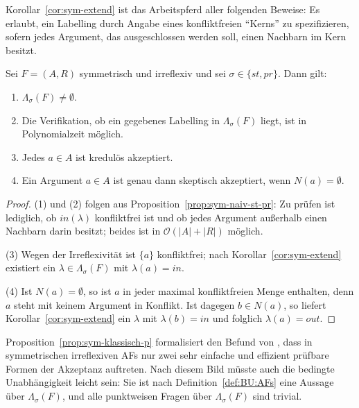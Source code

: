 Korollar~\ref{cor:sym-extend} ist das Arbeitspferd aller folgenden Beweise: Es
erlaubt, ein Labelling durch Angabe eines konfliktfreien \enquote{Kerns} zu
spezifizieren, sofern jedes Argument, das ausgeschlossen werden soll, einen
Nachbarn im Kern besitzt.

\begin{Proposition}
    \label{prop:sym-klassisch-p}
    Sei \(F=(A,R)\) symmetrisch und irreflexiv und sei \(\sigma\in\{st,pr\}\).
    Dann gilt:
    \begin{enumerate}
        \item \(\Lambda_\sigma(F)\neq\emptyset\).
        \item Die Verifikation, ob ein gegebenes Labelling in
        \(\Lambda_\sigma(F)\) liegt, ist in Polynomialzeit möglich.
        \item Jedes \(a\in A\) ist kredulös akzeptiert.
        \item Ein Argument \(a\in A\) ist genau dann skeptisch akzeptiert, wenn
        \(N(a)=\emptyset\).
    \end{enumerate}
\end{Proposition}

\begin{proof}
    (1) und (2) folgen aus Proposition~\ref{prop:sym-naiv-st-pr}: Zu prüfen ist
    lediglich, ob \(\mathit{in}(\lambda)\) konfliktfrei ist und ob jedes
    Argument außerhalb einen Nachbarn darin besitzt; beides ist in
    \(\mathcal{O}(|A|+|R|)\) möglich.

    (3) Wegen der Irreflexivität ist \(\{a\}\) konfliktfrei; nach
    Korollar~\ref{cor:sym-extend} existiert ein \(\lambda\in\Lambda_\sigma(F)\)
    mit \(\lambda(a)=\mathit{in}\).

    (4) Ist \(N(a)=\emptyset\), so ist \(a\) in jeder maximal konfliktfreien
    Menge enthalten, denn \(a\) steht mit keinem Argument in Konflikt. Ist
    dagegen \(b\in N(a)\), so liefert Korollar~\ref{cor:sym-extend} ein
    \(\lambda\) mit \(\lambda(b)=\mathit{in}\) und folglich
    \(\lambda(a)=\mathit{out}\).
\end{proof}

Proposition~\ref{prop:sym-klassisch-p} formalisiert den Befund von
\textcite{Coste:2005:symmetric-af-irflx-coherent}, dass in symmetrischen
irreflexiven AFs nur zwei sehr einfache und effizient prüfbare Formen der
Akzeptanz auftreten. Nach diesem Bild müsste auch die bedingte Unabhängigkeit
leicht sein: Sie ist nach Definition~\ref{def:BU:AFs} eine Aussage über
\(\Lambda_\sigma(F)\), und alle punktweisen Fragen über \(\Lambda_\sigma(F)\)
sind trivial.

